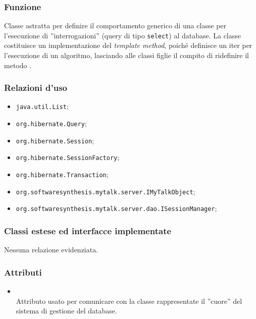
\subsubsection*{Funzione}
Classe astratta per definire il comportamento generico di una classe per l'esecuzione di ''interrogazioni'' (query di tipo \texttt{select}) al database. La classe costituisce un implementazione del \textit{template method}, poiché definisce un iter per l'esecuzione di un algoritmo, lasciando alle classi figlie il compito di ridefinire il metodo .

\subsubsection*{Relazioni d'uso}

\begin{itemize}
		\item \texttt{java.util.List};
		\item \texttt{org.hibernate.Query};
		\item \texttt{org.hibernate.Session};
		\item \texttt{org.hibernate.SessionFactory};
		\item \texttt{org.hibernate.Transaction};
		\item \texttt{org.softwaresynthesis.mytalk.server.IMyTalkObject};
		\item \texttt{org.softwaresynthesis.mytalk.server.dao.ISessionManager};
\end{itemize}

\subsubsection*{Classi estese ed interfacce implementate}

Nessuna relazione evidenziata.

\subsubsection*{Attributi}

\begin{itemize}
	\item{}\\
	Attributo usato per comunicare con la classe rappresentate il ''cuore'' del sistema di gestione del database.
\end{itemize}


